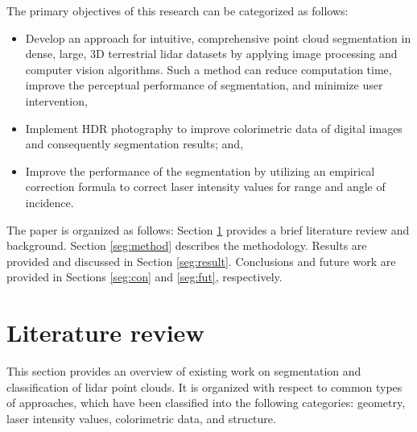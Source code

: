 \documentclass[final,3p,times,twocolumn,authoryear]{elsarticle}
\begin{document}
The primary objectives of this research can be categorized as follows:
\begin{itemize}
	\item	Develop an approach for intuitive, comprehensive point cloud segmentation in dense, large, 3D terrestrial lidar datasets by applying image processing and computer vision algorithms. Such a method can reduce computation time, improve the perceptual performance of segmentation, and minimize user intervention, 
	\item	Implement HDR photography to improve colorimetric data of digital images and consequently segmentation results; and,
	\item	Improve the performance of the segmentation by utilizing an empirical correction formula to correct laser intensity values for range and angle of incidence.
\end{itemize}

The paper is organized as follows: Section \ref{seg:lit} provides a brief literature review and background. Section \ref{seg:method} describes the methodology. Results are provided and discussed in Section \ref{seg:result}. Conclusions and future work are provided in Sections \ref{seg:con} and \ref{seg:fut}, respectively. 



\section{Literature review}
\label{seg:lit}

This section provides an overview of existing work on segmentation and classification of lidar point clouds. It is organized with respect to common types of approaches, which have been classified into the following categories: geometry, laser intensity values, colorimetric data, and structure.
\end{document}
